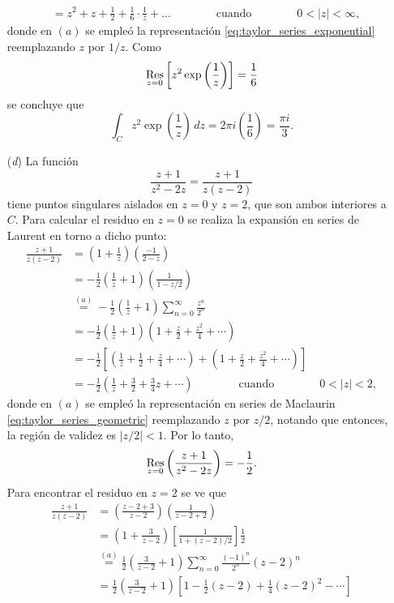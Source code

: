 \documentclass[a4paper]{report}
\def\Res{\qopname\relax m{Res}}
\begin{document}
\begin{enumerate}
\begin{align*}
    &=z^2+z+\frac{1}{2}+\frac{1}{6}\cdot\frac{1}{z}+\dots
    \qquad\qquad\textrm{cuando}\qquad\qquad
    0<|z|<\infty,
 \end{align*}
 donde en \((a)\) se empleó la representación \ref{eq:taylor_series_exponential} reemplazando \(z\) por \(1/z\). Como
 \[
  \Res_{z=0}\left[z^2\exp\left(\frac{1}{z}\right)\right]=\frac{1}{6}
 \]
 se concluye que 
 \[
  \int_Cz^2\exp\left(\frac{1}{z}\right)\,dz=2\pi i\left(\frac{1}{6}\right)=\frac{\pi i}{3}.
 \]
 \item[(\textit{d})] La función
 \[
  \frac{z+1}{z^2-2z}=\frac{z+1}{z(z-2)}
 \]
 tiene puntos singulares aislados en \(z=0\) y \(z=2\), que son ambos interiores a \(C\). Para calcular el residuo en \(z=0\) se realiza la expansión en series de Laurent en torno a dicho punto:
 \begin{align*}
  \frac{z+1}{z(z-2)}&=\left(1+\frac{1}{z}\right)\left(\frac{-1}{2-z}\right)\\
   &=-\frac{1}{2}\left(\frac{1}{z}+1\right)\left(\frac{1}{1-z/2}\right)\\
   &\overset{(a)}{=}-\frac{1}{2}\left(\frac{1}{z}+1\right)\sum_{n=0}^\infty\frac{z^n}{2^n}\\
   &=-\frac{1}{2}\left(\frac{1}{z}+1\right)\left(1+\frac{z}{2}+\frac{z^2}{4}+\cdots\right)\\
   &=-\frac{1}{2}\left[\left(\frac{1}{z}+\frac{1}{2}+\frac{z}{4}+\cdots\right)+\left(1+\frac{z}{2}+\frac{z^2}{4}+\cdots\right)\right]\\
   &=-\frac{1}{2}\left(\frac{1}{z}+\frac{3}{2}+\frac{3}{4}z+\cdots\right)
   \qquad\qquad\textrm{cuando}\qquad\qquad
    0<|z|<2,
 \end{align*}
 donde en \((a)\) se empleó la representación en series de Maclaurin \ref{eq:taylor_series_geometric} reemplazando \(z\) por \(z/2\), notando que entonces, la región de validez es \(|z/2|<1\).
 Por lo tanto,
 \[
  \Res_{z=0}\left(\frac{z+1}{z^2-2z}\right)=-\frac{1}{2}.
 \]
 Para encontrar el residuo en \(z=2\) se ve que 
 \begin{align*}
  \frac{z+1}{z(z-2)}&=\left(\frac{z-2+3}{z-2}\right)\left(\frac{1}{z-2+2}\right)\\
   &=\left(1+\frac{3}{z-2}\right)\left[\frac{1}{1+(z-2)/2}\right]\frac{1}{2}\\
   &\overset{(a)}{=}\frac{1}{2}\left(\frac{3}{z-2}+1\right)\sum_{n=0}^{\infty}\frac{(-1)^n}{2^n}(z-2)^n\\
   &=\frac{1}{2}\left(\frac{3}{z-2}+1\right)\left[1-\frac{1}{2}(z-2)+\frac{1}{4}(z-2)^2-\cdots\right]\\

\end{align*}
\end{enumerate}
\end{document}
